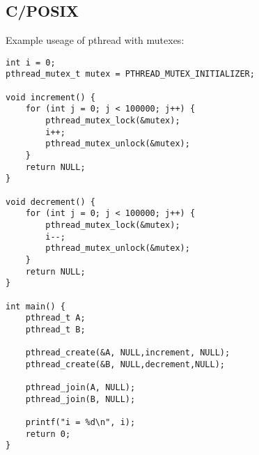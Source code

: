 \subsection{C/POSIX}
Example useage of pthread with mutexes:
\begin{verbatim}
int i = 0;
pthread_mutex_t mutex = PTHREAD_MUTEX_INITIALIZER;

void increment() {
    for (int j = 0; j < 100000; j++) {
        pthread_mutex_lock(&mutex);
        i++;
        pthread_mutex_unlock(&mutex);
    }
    return NULL;
}

void decrement() {
    for (int j = 0; j < 100000; j++) {
        pthread_mutex_lock(&mutex);
        i--;
        pthread_mutex_unlock(&mutex);
    }
    return NULL;
}

int main() {
    pthread_t A;
    pthread_t B;
    
    pthread_create(&A, NULL,increment, NULL);
    pthread_create(&B, NULL,decrement,NULL);
    
    pthread_join(A, NULL);
    pthread_join(B, NULL);
    
    printf("i = %d\n", i);
    return 0;
}
\end{verbatim}